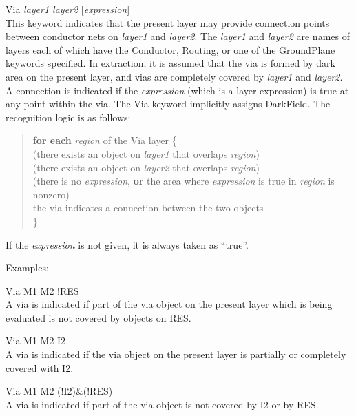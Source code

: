 \begin{description}
\item{\et Via {\it layer1 layer2\/} [{\it expression\/}]}\\
This keyword indicates that the present layer may provide connection
points between conductor nets on {\it layer1\/} and {\it layer2\/}. 
The {\it layer1\/} and {\it layer2\/} are names of layers each of
which have the {\et Conductor}, {\et Routing}, or one of the
GroundPlane keywords specified.  In extraction, it is assumed that the
via is formed by dark area on the present layer, and vias are
completely covered by {\it layer1\/} and {\it layer2\/}.  A connection
is indicated if the {\it expression} (which is a layer expression) is
true at any point within the via.  The {\et Via} keyword implicitly
assigns {\et DarkField}.  The recognition logic is as follows:

\begin{quote}
{\bf for each} {\it region} of the {\et Via} layer \{\\
\hspace*{2mm}{\bf if} (there exists an object on {\it layer1} that overlaps {\it region})\\
\hspace*{4mm}{\bf if} (there exists an object on {\it layer2} that overlaps {\it region})\\
\hspace*{6mm}{\bf if} (there is no {\it expression}, {\bf or} the area where {\it expression} is true in {\it region} is nonzero)\\
\hspace*{8mm}{\bf then} the via indicates a connection between the two objects\\
\}
\end{quote}

If the {\it expression} is not given, it is always taken as ``true''.

Examples:
\begin{description}
\item{\vt Via M1 M2 !RES}\\
A via is indicated if part of the via object on the present layer
which is being evaluated is not covered by objects on {\vt RES}.

\item{\vt Via M1 M2 I2}\\
A via is indicated if the via object on the present layer is
partially or completely covered with {\vt I2}.

\item{\vt Via M1 M2 (!I2)\&(!RES)}\\
A via is indicated if part of the via object is not covered by {\vt I2}
or by {\vt RES}.
\end{description}


\end{description}
